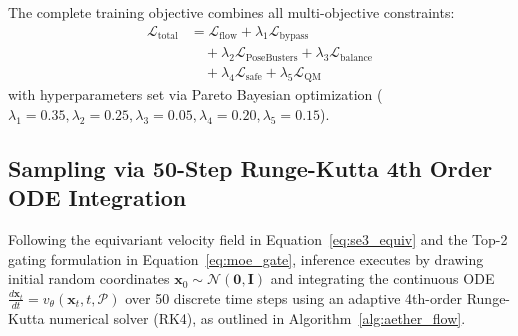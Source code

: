 The complete training objective combines all multi-objective constraints:
\begin{equation}
\begin{split}
\mathcal{L}_{\text{total}} &= \mathcal{L}_{\text{flow}} + \lambda_1 \mathcal{L}_{\text{bypass}} \\
&\quad + \lambda_2 \mathcal{L}_{\text{PoseBusters}} + \lambda_3 \mathcal{L}_{\text{balance}} \\
&\quad + \lambda_4 \mathcal{L}_{\text{safe}} + \lambda_5 \mathcal{L}_{\text{QM}}
\end{split}
\label{eq:total_loss}
\end{equation}
with hyperparameters set via Pareto Bayesian optimization ($\lambda_1 = 0.35, \lambda_2 = 0.25, \lambda_3 = 0.05, \lambda_4 = 0.20, \lambda_5 = 0.15$).

\subsection{Sampling via 50-Step Runge-Kutta 4th Order ODE Integration}
Following the equivariant velocity field in Equation~\eqref{eq:se3_equiv} and the Top-2 gating formulation in Equation~\eqref{eq:moe_gate}, inference executes by drawing initial random coordinates $\mathbf{x}_0 \sim \mathcal{N}(\mathbf{0}, \mathbf{I})$ and integrating the continuous ODE $\frac{d\mathbf{x}_t}{dt} = v_\theta(\mathbf{x}_t, t, \mathcal{P})$ over 50 discrete time steps using an adaptive 4th-order Runge-Kutta numerical solver (RK4), as outlined in Algorithm~\ref{alg:aether_flow}.


